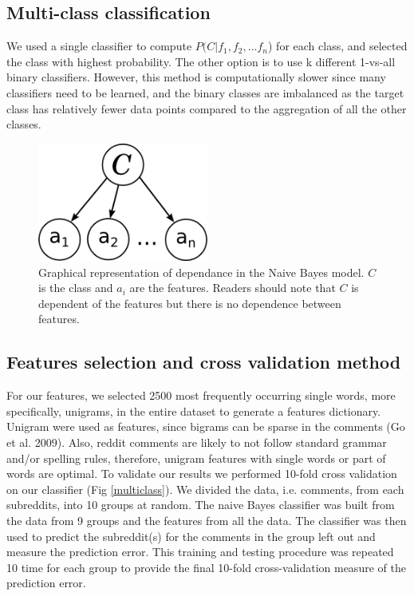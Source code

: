 \documentclass[10pt,twocolumn]{article}
\begin{document}
\subsection*{Multi-class classification}
We used a single classifier to compute $P(C|f_1,f_2,...f_n$) for each class, and selected the class with highest probability.
The other option is to use k different 1-vs-all binary classifiers. However, this method is computationally slower since many classifiers need to be learned, and the binary classes are imbalanced as the target class has relatively fewer data points compared to the aggregation of all the other classes.

\begin{figure}
    \centering  
    \includegraphics[width=0.5\textwidth]{./sysmag_bayes.png}
    \caption{Graphical representation of dependance in the Naive Bayes model. $C$ is the class and $a_i$ are the features. Readers should note that $C$ is dependent of the features but there is no dependence between features. }
    \label{bayesnet}
\end{figure}

\subsection*{Features selection and cross validation method}
For our features, we selected 2500 most frequently occurring single words, more specifically, unigrams, in the entire dataset to generate a features dictionary. Unigram were used as features, since bigrams can be sparse in the comments (Go et al. 2009). Also, reddit comments are likely to not follow standard grammar and/or spelling rules, therefore, unigram features with single words or part of words are optimal.
To validate our results we performed 10-fold cross validation on our classifier (Fig \ref{multiclass}). We divided the data, i.e. comments, from each subreddits, into 10 groups at random. The naive Bayes classifier was built from the data from 9 groups and the features from all the data. The classifier was then used to predict the subreddit(s) for the comments in the group left out and measure the prediction error. This training and testing procedure was repeated 10 time for each group to provide the final 10-fold cross-validation measure of the prediction error.
\end{document}
